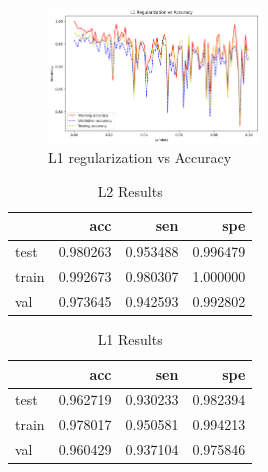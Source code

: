 \documentclass[12pt,a4paper,twocolumn]{article}
\begin{document}
\begin{figure}[H]
\includegraphics[width=0.5\textwidth]{images/l1.png}
\centering
\caption{\label{fig:l1} L1 regularization vs Accuracy}
\end{figure}

\begin{table}[h!]
\begin{tabular}{lrrr}
\toprule
{} &       acc &       sen &       spe \\
\midrule
test  &  0.980263 &  0.953488 &  0.996479 \\
train &  0.992673 &  0.980307 &  1.000000 \\
val   &  0.973645 &  0.942593 &  0.992802 \\
\bottomrule
\end{tabular}


    \caption{L2 Results}
    \label{tab:results_l2}
\end{table}

\begin{table}[h!]
\begin{tabular}{lrrr}
\toprule
{} &       acc &       sen &       spe \\
\midrule
test  &  0.962719 &  0.930233 &  0.982394 \\
train &  0.978017 &  0.950581 &  0.994213 \\
val   &  0.960429 &  0.937104 &  0.975846 \\
\bottomrule
\end{tabular}



    \caption{L1 Results}
    \label{tab:results_l1}
\end{table}
\end{document}
